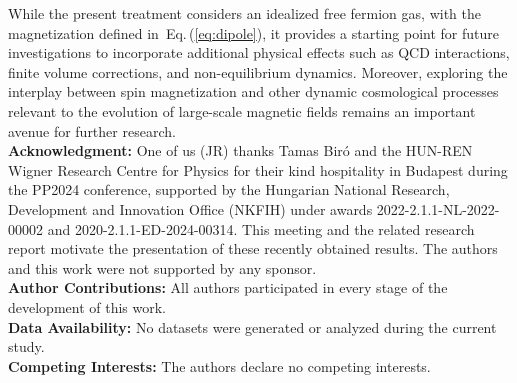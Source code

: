 \documentclass[epjST]{svjour}
\newcommand{\req}[1]{Eq.\,(\ref{#1})}
\begin{document}
While the present treatment considers an idealized free fermion gas, with the magnetization defined in~\req{eq:dipole}, it provides a starting point for future investigations to incorporate additional physical effects such as QCD interactions, finite volume corrections, and non-equilibrium dynamics. Moreover, exploring the interplay between spin magnetization and other dynamic cosmological processes relevant to the evolution of large-scale magnetic fields remains an important avenue for further research.\\

\noindent\textbf{Acknowledgment:} 
One of us (JR) thanks Tamas Bir\'o and the {\color{blue} HUN-REN Wigner Research Centre for Physics for their kind hospitality in Budapest during the PP2024 conference, supported by the Hungarian National Research, Development and Innovation Office (NKFIH)} under awards 2022-2.1.1-NL-2022-00002 and 2020-2.1.1-ED-2024-00314. This meeting and the related research report motivate the presentation of these recently obtained results. The authors and this work were not supported by any sponsor.\\
\textbf{Author Contributions:} All authors participated in every stage of the development of this work.\\
\textbf{Data Availability:} No datasets were generated or analyzed during the current study.\\
\textbf{Competing Interests:} The authors declare no competing interests.



\end{document}
